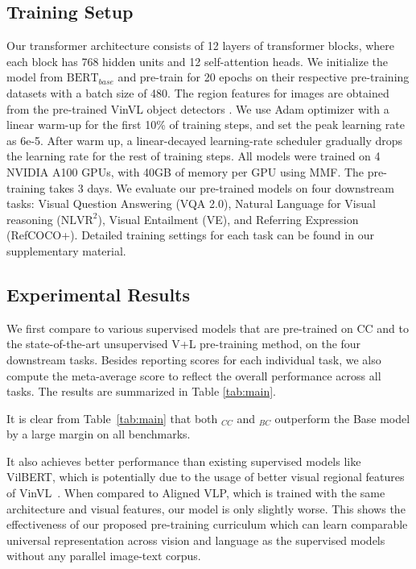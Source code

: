 \subsection {Training Setup}\label{sec:training_setup}
Our transformer architecture consists of 12 layers of transformer blocks, where each block has 768 hidden units and 12 self-attention heads. 
We initialize the model from $\text{BERT}_{base}$ and pre-train for 20 epochs on their respective pre-training datasets with a batch size of 480. The region features for images are obtained from the pre-trained VinVL object detectors \cite{zhang2021vinvl}. We use Adam optimizer \cite{ADAM} with a linear warm-up for the first 10\% of training steps, and set the peak learning rate as 6e-5. After warm up, a linear-decayed learning-rate scheduler gradually drops the learning rate for the rest of training steps. 
All models were trained on 4 NVIDIA A100 GPUs, with 40GB of memory per GPU using MMF\cite{singh2020mmf}.
The pre-training takes 3 days.
We evaluate our pre-trained models on four downstream tasks: Visual Question Answering (VQA 2.0)\cite{anderson2018bottom}, Natural Language for Visual reasoning\cite{suhr2018corpus} ($\text{NLVR}^2$), Visual Entailment\cite{xie2019visual} (VE), and Referring Expression\cite{yu2016modeling} (RefCOCO+). 
Detailed training settings for each task can be found in our supplementary material. 
\subsection{Experimental Results}
We first compare {\ModelName } to various supervised models that are pre-trained on CC and to the state-of-the-art unsupervised V+L pre-training method, {\uvisualbert } on the four downstream tasks. Besides reporting scores for each individual task, we also compute the meta-average score to reflect the overall performance across all tasks. 
The results are summarized in Table \ref{tab:main}.

 It is clear from Table~\ref{tab:main} that both \ModelName$_{CC}$ and \ModelName$_{BC}$ outperform the Base model by a large margin on all benchmarks. 


 It also achieves better performance than existing supervised models like VilBERT\cite{lu2019vilbert}, which is potentially due to the usage of better visual regional features of VinVL~\cite{Zhang_2021_CVPR}. When compared to Aligned VLP, which is trained with the same architecture and visual features, our model is only slightly worse. 
This shows the effectiveness of our proposed pre-training curriculum which can learn comparable universal representation across vision and language as the supervised models without any parallel image-text corpus. 


